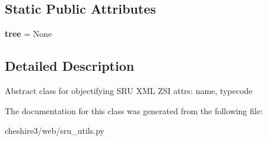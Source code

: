 \subsection*{Static Public Attributes}
\begin{DoxyCompactItemize}
\item 
\hypertarget{classcheshire3_1_1web_1_1sru__utils_1_1_sru_object_af9d8dafb0a2050ff9dfdba62bd3b6e76}{{\bfseries tree} = None}\label{classcheshire3_1_1web_1_1sru__utils_1_1_sru_object_af9d8dafb0a2050ff9dfdba62bd3b6e76}

\end{DoxyCompactItemize}


\subsection{Detailed Description}
\begin{DoxyVerb}Abstract class for objectifying SRU XML
ZSI attrs: name, typecode
\end{DoxyVerb}
 

The documentation for this class was generated from the following file\-:\begin{DoxyCompactItemize}
\item 
cheshire3/web/sru\-\_\-utils.\-py\end{DoxyCompactItemize}
